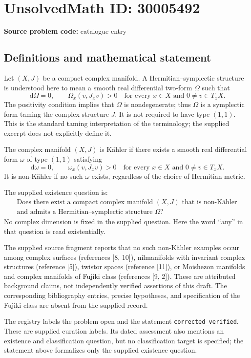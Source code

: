 \documentclass[11pt]{article}
\newcommand{\dd}{\,\mathrm{d}}
\begin{document}
\section*{UnsolvedMath ID: 30005492}
\textbf{Source problem code:} catalogue entry
\subsection{Definitions and mathematical statement}
Let \((X,J)\) be a compact complex manifold. A Hermitian--symplectic structure is understood here to mean a smooth real differential two-form \(\Omega\) such that
\[
\dd\Omega=0,
\qquad
\Omega_x(v,J_xv)>0
\quad\text{for every }x\in X\text{ and }0\ne v\in T_xX.
\]
The positivity condition implies that \(\Omega\) is nondegenerate; thus \(\Omega\) is a symplectic form taming the complex structure \(J\). It is not required to have type \((1,1)\). This is the standard taming interpretation of the terminology; the supplied excerpt does not explicitly define it.

The complex manifold \((X,J)\) is Kähler if there exists a smooth real differential form \(\omega\) of type \((1,1)\) satisfying
\[
\dd\omega=0,
\qquad
\omega_x(v,J_xv)>0
\quad\text{for every }x\in X\text{ and }0\ne v\in T_xX.
\]
It is non-Kähler if no such \(\omega\) exists, regardless of the choice of Hermitian metric.

The supplied existence question is:
\[
\begin{gathered}
\text{Does there exist a compact complex manifold }(X,J)
\text{ that is non-Kähler}\\
\text{and admits a Hermitian--symplectic structure }\Omega?
\end{gathered}
\]
No complex dimension is fixed in the supplied question. Here the word ``any'' in that question is read existentially.

The supplied source fragment reports that no such non-Kähler examples occur among complex surfaces (references [8, 10]), nilmanifolds with invariant complex structures (reference [5]), twistor spaces (reference [11]), or Moishezon manifolds and complex manifolds of Fujiki class (references [9, 2]). These are attributed background claims, not independently verified assertions of this draft. The corresponding bibliography entries, precise hypotheses, and specification of the Fujiki class are absent from the supplied record.

The registry labels the problem open and the statement \texttt{corrected\_verified}. These are supplied curation labels. Its dated assessment also mentions an existence and classification question, but no classification target is specified; the statement above formalizes only the supplied existence question.
\end{document}
